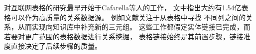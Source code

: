 % 

对互联网表格的研究最早开始于Cafarella等人的工作\cite{cafarella2008webtables}，
文中指出大约有1.54亿表格可以作为高质量的关系数据源。
例如文献\parencite{munoz2014using,sekhavat2014knowledge}关注于从表格中寻找
不同列之间的关系，从而实现向知识库中补充新的三元组。
这些工作都假定实体链接已完成，而若要对更广范围的表格数据进行关系挖掘，
表格链接始终是其前置步骤，链接准度直接决定了后续步骤的质量。

